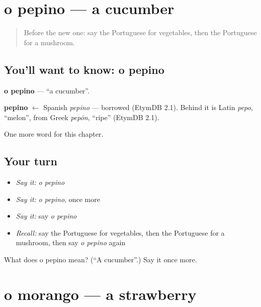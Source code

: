\section[o pepino]{o pepino — a cucumber}

\label{lesson:PT-C105-pepino}



\begin{quote}
Before the new one: say the Portuguese for vegetables, then the Portuguese for a mushroom.
\end{quote}

\subsection*{You'll want to know: o pepino}
\textbf{o pepino} — \textquotedblleft{}a cucumber\textquotedblright{}.

\begin{cousinweb}
\textbf{pepino} $\leftarrow$ Spanish \emph{pepino} — borrowed (EtymDB 2.1). Behind it is Latin \emph{pepo}, \textquotedblleft{}melon\textquotedblright{}, from Greek \emph{pepōn}, \textquotedblleft{}ripe\textquotedblright{} (EtymDB 2.1).
\end{cousinweb}

\begin{grammarlens}[title={What you've built}]
One more word for this chapter.
\end{grammarlens}

\subsection*{Your turn}
\begin{itemize}
\raggedright
  \item \emph{Say it:} \emph{o pepino}
  \item \emph{Say it:} \emph{o pepino}, once more
  \item \emph{Say it:} say \emph{o pepino}
  \item \emph{Recall:} say the Portuguese for vegetables, then the Portuguese for a mushroom, then say \emph{o pepino} again
\end{itemize}

\begin{tcolorbox}[breakable,colback=teal!4,colframe=teal!35!black,title={Before you move on}]
What does o pepino mean? (\textquotedblleft{}A cucumber\textquotedblright{}.) Say it once more.
\end{tcolorbox}
\section[o morango]{o morango — a strawberry}

